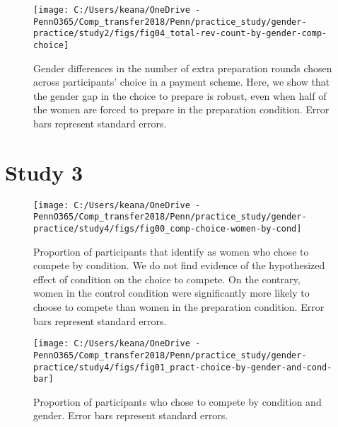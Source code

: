 \documentclass[a4paper,nobind]{templates/ociamthesis}
\newcommand*{\bibtitle}{References}
\begin{document}
\begin{figure}
\texttt{[image: C:/Users/keana/OneDrive - PennO365/Comp\_transfer2018/Penn/practice\_study/gender-practice/study2/figs/fig04\_total-rev-count-by-gender-comp-choice]} \caption{Gender differences in the number of extra preparation rounds chosen across participants' choice in a payment scheme. Here, we show that the gender gap in the choice to prepare is robust, even when half of the women are forced to prepare in the preparation condition. Error bars represent standard errors.}\label{fig:s204}
\end{figure}

\hypertarget{study-3-1}{%
\section{Study 3}\label{study-3-1}}

\begin{figure}
\texttt{[image: C:/Users/keana/OneDrive - PennO365/Comp\_transfer2018/Penn/practice\_study/gender-practice/study4/figs/fig00\_comp-choice-women-by-cond]} \caption{Proportion of participants that identify as women who chose to compete by condition. We do not find evidence of the hypothesized effect of condition on the choice to compete. On the contrary, women in the control condition were significantly more likely to choose to compete than women in the preparation condition. Error bars represent standard errors.}\label{fig:s300}
\end{figure}

\begin{figure}
\texttt{[image: C:/Users/keana/OneDrive - PennO365/Comp\_transfer2018/Penn/practice\_study/gender-practice/study4/figs/fig01\_pract-choice-by-gender-and-cond-bar]} \caption{Proportion of participants who chose to compete by condition and gender. Error bars represent standard errors.}\label{fig:s301}
\end{figure}




\setlength{\baselineskip}{0pt} %

{\renewcommand*\MakeUppercase[1]{#1}%
\printbibliography[heading=bibintoc,title={\bibtitle}]}
\end{document}
